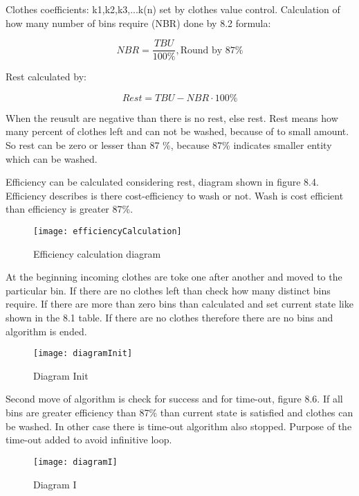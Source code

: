 Clothes coefficients: k1,k2,k3,...k(n) set by clothes value control.
Calculation of how many number of bins require (NBR) done by 8.2 formula:  

\begin{equation}
NBR=\frac{TBU}{100\%},\textrm{Round by 87\%} \label{eq:eq2}
\end{equation}


Rest calculated by:

\begin{equation}
Rest=TBU-NBR\cdot 100\% \label{eq:eq3}
\end{equation}

When the reusult are negative than there is no rest, else rest. Rest means how many percent of clothes left and can not be washed, because of to small amount. So rest can be zero or lesser than 87 \%, because 87\% indicates smaller entity which can be washed.


Efficiency can be calculated considering rest, diagram shown in figure 8.4. Efficiency describes is there cost-efficiency to wash or not. Wash is cost efficient than efficiency is greater 87\%.


\begin{figure}[h]
	\centering
		\texttt{[image: efficiencyCalculation]}
	\caption{Efficiency calculation diagram}
	\label{fig:planning}
\end{figure}

At the beginning incoming clothes are toke one after another and moved to the particular bin. If there are no clothes left than check how many distinct bins require. If there are more than zero bins than calculated and set current state like shown in the 8.1 table. If there are no clothes therefore there are no bins and algorithm is ended. \newpage

\begin{figure}[h]
	\centering
		\texttt{[image: diagramInit]}
	\caption{Diagram Init}
	\label{fig:planning}
\end{figure}


Second move of algorithm is check for success and for time-out, figure 8.6. If all bins are greater efficiency than 87\% than current state is satisfied and clothes can be washed. In other case there is time-out algorithm also stopped. Purpose of the time-out added to avoid infinitive loop.

\begin{figure}[h]
	\centering
		\texttt{[image: diagramI]}
	\caption{Diagram I}
	\label{fig:planning}
\end{figure}

